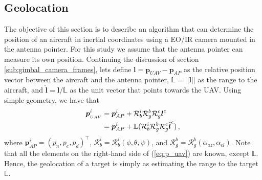 \pagebreak
\subsection{Geolocation}{\label{geolocation}}
The objective of this section is to describe an algorithm that can determine the position of an aircraft in inertial coordinates using a EO/IR camera mounted in the antenna pointer. For this study we assume that the antenna pointer can measure its own position.
Continuing the discussion of section \ref{sub:gimbal_camera_frames}, lets define $\boldsymbol{l}=\boldsymbol{p}_{UAV}-\boldsymbol{p}_{AP}$ as the relative position vector between the aircraft and the antenna pointer, $\mathbb{L}=\lvert\lvert \boldsymbol{l}\rvert\rvert$ as the range to the aircraft, and $\check{\boldsymbol{l}}=\boldsymbol{l}/\mathbb{L}$ as the unit vector that points towards the UAV. Using simple geometry, we have that
\begin{align}{\label{eq:p_uav}}
\boldsymbol{p}_{_{UAV}}^i&=\boldsymbol{p}_{AP}^i+\mathcal{R}_b^i\mathcal{R}_g^b\mathcal{R}_g^c\boldsymbol{l}^c\nonumber \\
&= \boldsymbol{p}_{AP}^i+\mathbb{L}(\mathcal{R}_b^i\mathcal{R}_g^b\mathcal{R}_g^c\check{\boldsymbol{l}}^c)\,,
\end{align}
where $\boldsymbol{p}_{AP}^i=(p_n,p_e,p_d)^\top$, $\mathcal{R}_b^i=\mathcal{R}_b^i(\phi,\theta,\psi)$, and $\mathcal{R}_g^b=\mathcal{R}_g^b(\alpha_{az},\alpha_{el})$. Note that all the elements on the right-hand side of (\ref{eq:p_uav}) are known, except $\mathbb{L}$. Hence, the geolocation of a target is simply as estimating the range to the target $\mathbb{L}$.

